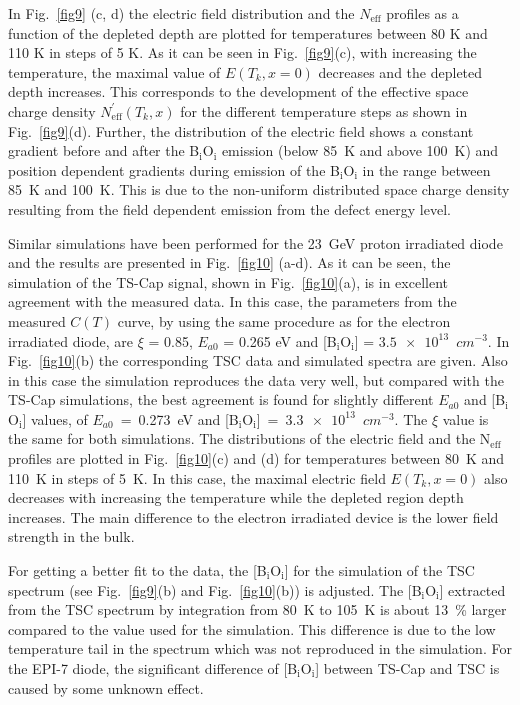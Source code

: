 \documentclass[final, 5p, times]{elsarticle}
\begin{document}
In Fig.~\ref{fig9} (c, d) the electric field distribution and the $N_\text{eff}$ profiles as a function of the depleted depth are plotted for temperatures between 80 K and 110 K in steps of 5 K. As it can be seen in Fig.~\ref{fig9}(c), with increasing the temperature, the maximal value of $E(T_{k}, x=0)$ decreases and the depleted depth increases. This corresponds to the development of the effective space charge density $N^{'}_\text{eff}(T_{k}, x)$ for the different temperature steps as shown in Fig.~\ref{fig9}(d). Further, the distribution of the electric field shows a constant gradient before and after the B$_\text{i}$O$_\text{i}$ emission (below 85~K and above 100~K) and position dependent gradients during emission of the B$_\text{i}$O$_\text{i}$ in the range between 85~K and 100~K. This is due to the non-uniform distributed space charge density resulting from the field dependent emission from the defect energy level.
\par
Similar simulations have been performed for the 23~GeV proton irradiated diode and the results are presented in Fig.~\ref{fig10} (a-d). As it can be seen, the simulation of the TS-Cap signal, shown in Fig.~\ref{fig10}(a), is in excellent agreement with the measured data. In this case, the parameters from the measured $C(T)$ curve, by using the same procedure as for the electron irradiated diode, are $\xi$ = 0.85, $E_{a0}$ = 0.265 eV and [B$_\text{i}$O$_\text{i}$] = $\num{3.5e13}$~$\si{cm^{-3}}$. In Fig.~\ref{fig10}(b) the corresponding TSC data and simulated spectra are given. Also in this case the simulation reproduces the data very well, but compared with the TS-Cap simulations, the best agreement is found for slightly different $E_{a0}$ and [B$_\text{i}$O$_\text{i}$] values, of $E_{a0}$~=~0.273~eV and [B$_\text{i}$O$_\text{i}$]~=~$\num{3.3e13}$~$\si{cm^{-3}}$. The $\xi$ value is the same for both simulations. The distributions of the electric field and the N$_\text{eff}$ profiles are plotted in Fig.~\ref{fig10}(c) and (d) for temperatures between 80~K and 110~K in steps of 5~K. In this case, the maximal electric field $E(T_{k}, x=0)$ also decreases with increasing the temperature while the depleted region depth increases. The main difference to the electron irradiated device is the lower field strength in the bulk.
\par
For getting a better fit to the data, the [B$_\text{i}$O$_\text{i}$] for the simulation of the TSC spectrum (see Fig.~\ref{fig9}(b) and Fig.~\ref{fig10}(b)) is adjusted. The [B$_\text{i}$O$_\text{i}$] extracted from the TSC spectrum by integration from 80~K to 105~K is about 13~\% larger compared to the value used for the simulation. This difference is due to the low temperature tail in the spectrum which was not reproduced in the simulation. For the EPI-7 diode, the significant difference of [B$_\text{i}$O$_\text{i}$] between TS-Cap and TSC is caused by some unknown effect.
\end{document}

